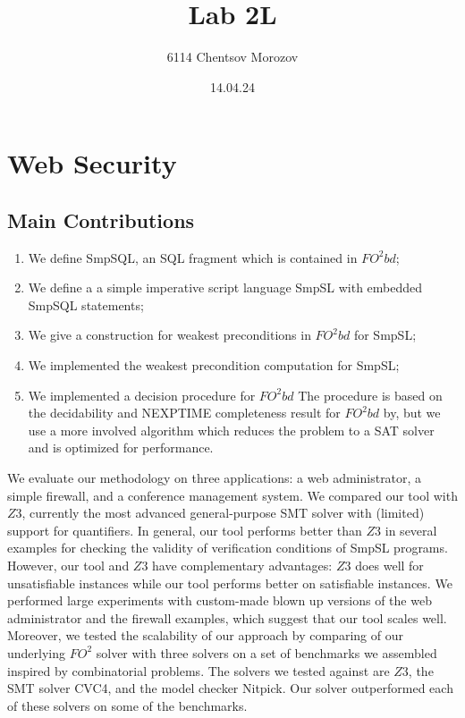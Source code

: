\documentclass[12pt]{acmart}
\begin{document}
\begin{titlepage}
\title{Lab 2L}
\author{6114 Chentsov Morozov}
\date{14.04.24}
\maketitle
\thispagestyle{empty}
\end{titlepage}


\tableofcontents
\newpage


\section{Web Security}

\subsection{Main Contributions}

\begin{enumerate}
    \item We define SmpSQL, an SQL fragment which is contained in $FO^2bd$;
    \item We define a a simple imperative script language SmpSL with embedded SmpSQL statements;
    \item We give a construction for weakest preconditions in $FO^2bd$ for SmpSL;
    \item We implemented the weakest precondition computation for SmpSL;
    \item We implemented a decision procedure for $FO^2bd$ The procedure is based on the decidability and NEXPTIME completeness result for $FO^2bd$ by, but we use a more involved algorithm which reduces the problem to a SAT solver and is optimized for performance.
\end{enumerate}

We evaluate our methodology on three applications: a web administrator, a simple firewall, and a conference management system. We compared our tool with $Z3$, currently the most advanced general-purpose SMT solver with (limited) support for quantifiers. In general, our tool performs better than $Z3$ in several examples for checking the validity of verification conditions of SmpSL programs. However, our tool and $Z3$ have complementary advantages: $Z3$ does well for unsatisfiable instances while our tool performs better on satisfiable instances. We performed large experiments with custom-made blown up versions of the web administrator and the firewall examples, which suggest that our tool scales well. Moreover, we tested the scalability of our approach by comparing of our underlying $FO^2$ solver with three solvers on a set of benchmarks we assembled inspired by combinatorial problems. The solvers we tested against are $Z3$, the SMT solver CVC4, and the model checker Nitpick. Our solver outperformed each of these solvers on some of the benchmarks.
\end{document}
